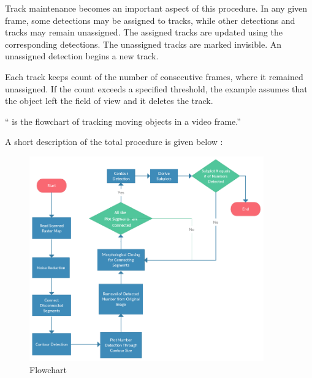Track maintenance becomes an important aspect of this procedure. In any given frame, some detections may be assigned to tracks, while other detections and tracks may remain unassigned. The assigned tracks are updated using the corresponding detections. The unassigned tracks are marked invisible. An unassigned detection begins a new track.

Each track keeps count of the number of consecutive frames, where it remained unassigned. If the count exceeds a specified threshold, the example assumes that the object left the field of view and it deletes the track.

`` is the flowchart of tracking moving objects in a video frame.''



A short description of the total procedure is given below :

\begin{figure}[H]
  \centering
  \includegraphics[width=0.9\textwidth]{figures/raster}
  \caption{Flowchart}
  \label{fig:raster}
\end{figure} 

